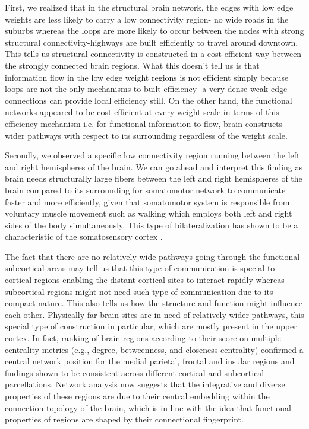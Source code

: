 \documentclass[9pt,twocolumn,twoside,lineno]{pnas-new}
\begin{document}
First, we realized that in the structural brain network, the edges with low edge weights are less likely to carry a low connectivity region- no wide roads in the suburbs whereas the loops are more likely to occur between the nodes with strong structural connectivity-highways are built efficiently to travel around downtown. This tells us structural connectivity is constructed in a cost efficient way between the strongly connected brain regions. What this doesn't tell us is that information flow in the low edge weight regions is not efficient simply because loops are not the only mechanisms to built efficiency- a very dense weak edge connections can provide local efficiency still. On the other hand, the functional networks appeared to be cost efficient at every weight scale in terms of this efficiency mechanism i.e. for functional information to flow, brain constructs wider pathways with respect to its surrounding regardless of the weight scale.

Secondly, we observed a specific low connectivity region running between the left and right hemispheres of the brain. We can go ahead and interpret this finding as brain needs structurally large fibers between the left and right hemispheres of the brain compared to its surrounding for somatomotor network to communicate faster and more efficiently, given that somatomotor system is responsible from voluntary muscle movement such as walking which employs both left and right sides of the body simultaneously. This type of bilateralization has shown to be a characteristic of the somatosensory cortex \cite{bilateral}.

The fact that there are no relatively wide pathways going through the functional subcortical areas may tell us that this type of communication is special to cortical regions enabling the distant cortical sites to interact rapidly whereas subcortical regions might not need such type of communication due to its compact nature. This also tells us how the structure and function might influence each other. Physically far brain sites are in need of relatively wider pathways, this special type of construction in particular, which are mostly present in the upper cortex. In fact, ranking of brain regions according to their score on multiple centrality metrics (e.g., degree, betweenness, and closeness centrality) confirmed a central network position for the medial parietal, frontal and insular regions\cite{structure-funct} and findings shown to be consistent across different cortical and subcortical parcellations. Network analysis now suggests
that the integrative and diverse properties of these regions
are due to their central embedding within the connection
topology of the brain, which is in line with the idea that
functional properties of regions are shaped by their connectional fingerprint.
\end{document}
